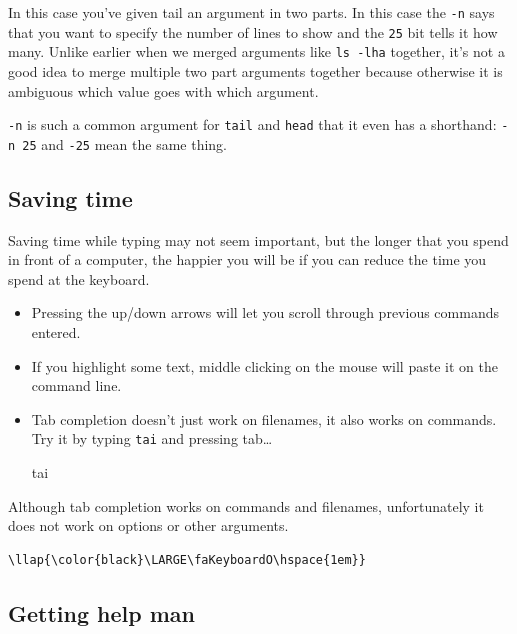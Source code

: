 \documentclass[11pt]{article}
\begin{document}
    In this case you've given tail an argument in two parts. In this case
the \texttt{-n} says that you want to specify the number of lines to
show and the \texttt{25} bit tells it how many. Unlike earlier when we
merged arguments like \texttt{ls\ -lha} together, it's not a good idea
to merge multiple two part arguments together because otherwise it is
ambiguous which value goes with which argument.

\texttt{-n} is such a common argument for \texttt{tail} and
\texttt{head} that it even has a shorthand: \texttt{-n\ 25} and
\texttt{-25} mean the same thing.

    \hypertarget{saving-time}{%
\subsection{Saving time}\label{saving-time}}

Saving time while typing may not seem important, but the longer that you
spend in front of a computer, the happier you will be if you can reduce
the time you spend at the keyboard.

\begin{itemize}
\item
  Pressing the up/down arrows will let you scroll through previous
  commands entered.
\item
  If you highlight some text, middle clicking on the mouse will paste it
  on the command line.
\item
  Tab completion doesn't just work on filenames, it also works on
  commands. Try it by typing \texttt{tai} and pressing tab\ldots{}

  tai
\end{itemize}

Although tab completion works on commands and filenames, unfortunately
it does not work on options or other arguments.

\begin{terminalinput}
\begin{Verbatim}[commandchars=\\\{\}]
\llap{\color{black}\LARGE\faKeyboardO\hspace{1em}}
\end{Verbatim}
\end{terminalinput}

    \hypertarget{getting-help-man}{%
\subsection{Getting help man}\label{getting-help-man}}
\end{document}

